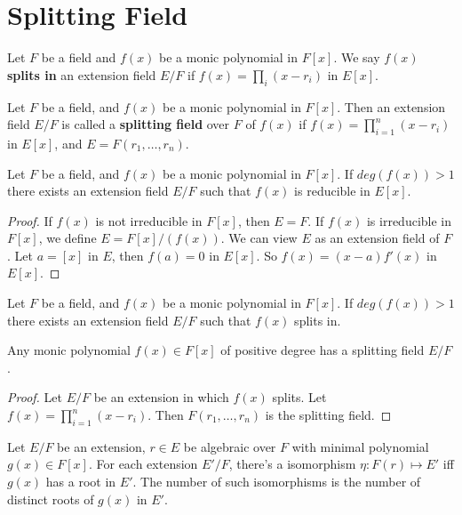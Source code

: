 \documentclass[12pt]{book}
\begin{document}
\section{Splitting Field}

\begin{definition}
	Let $F$ be a field and $f(x)$ be a monic polynomial in $F[x]$. We say $f(x)$ {\bf splits in} an extension field $E/F$ if $f(x)=\prod_i(x-r_i)$ in $E[x]$.
\end{definition}

\begin{definition}
	Let $F$ be a field, and $f(x)$ be a monic polynomial in $F[x]$. Then an extension field $E/F$ is called a {\bf splitting field} over $F$ of $f(x)$ if $f(x)=\prod_{i=1}^n(x-r_i)$ in $E[x]$, and $E=F(r_1,\dots,r_n)$.
\end{definition}

\begin{lemma}
	Let $F$ be a field, and $f(x)$ be a monic polynomial in $F[x]$. If $deg(f(x))>1$ there exists an extension field $E/F$ such that $f(x)$ is reducible in $E[x]$.
\end{lemma}
\begin{proof}
	If $f(x)$ is not irreducible in $F[x]$, then $E=F$. If $f(x)$ is irreducible in $F[x]$, we define $E=F[x]/(f(x))$. We can view $E$ as an extension field of $F$. Let $a=[x]$ in $E$, then $f(a)=0$ in $E[x]$. So $f(x)=(x-a)f'(x)$ in $E[x]$.
\end{proof}

\begin{corollary}
	Let $F$ be a field, and $f(x)$ be a monic polynomial in $F[x]$. If $deg(f(x))>1$ there exists an extension field $E/F$ such that $f(x)$ splits in.
\end{corollary}

\begin{lemma}
	Any monic polynomial $f(x)\in F[x]$ of positive degree has a splitting field $E/F$.
\end{lemma}
\begin{proof}
	Let $E/F$ be an extension in which $f(x)$ splits. Let $f(x)=\prod_{i=1}^n(x-r_i)$. Then $F(r_1,\dots,r_n)$ is the splitting field.
\end{proof}

\begin{lemma}
	Let $E/F$ be an extension, $r\in E$ be algebraic over $F$ with minimal polynomial $g(x)\in F[x]$. For each extension $E'/F$, there's a isomorphism $\eta :F(r)\mapsto E'$ iff $g(x)$ has a root in $E'$. The number of such isomorphisms is the number of distinct roots of $g(x)$ in $E'$.
\end{lemma}
\end{document}
